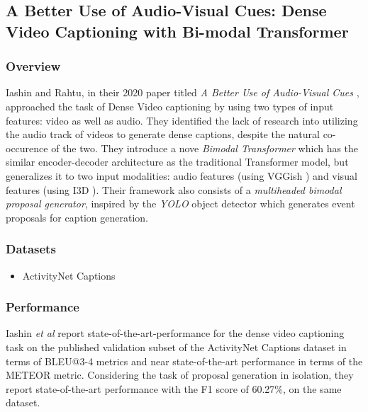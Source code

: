 \subsection{A Better Use of Audio-Visual Cues: Dense Video Captioning with Bi-modal Transformer}

\subsubsection{Overview}

\par Iashin and Rahtu, in their 2020 paper titled \textit{A Better Use of Audio-Visual Cues} \cite{iashin2020better},
approached the task of Dense Video captioning by using two types of input features: video as well as
audio. They identified the lack of research into utilizing the audio track of videos to generate
dense captions, despite the natural co-occurence of the two. They introduce a nove \textit{Bimodal
Transformer} which has the similar encoder-decoder architecture as the traditional Transformer model, 
but generalizes it to two input modalities:  audio features (using VGGish \cite{vggish}) and visual 
features (using I3D \cite{carreira2018quo}). Their  framework also consists of a \textit{multiheaded bimodal 
proposal generator}, inspired by the \textit{YOLO} object detector \cite{yolo} which generates event 
proposals for caption generation.


\subsubsection{Datasets}
\begin{itemize}
\item ActivityNet Captions \cite{krishna2017densecaptioning}
\end{itemize}

\subsubsection{Performance}
\par Iashin \textit{et al} report state-of-the-art-performance for the dense video captioning 
task on the published validation subset of the ActivityNet Captions dataset in terms of BLEU@3-4 
metrics and near state-of-the-art performance in terms of the METEOR metric. Considering the 
task of proposal generation in isolation, they report state-of-the-art performance with the F1 
score of 60.27\%, on the same dataset.


